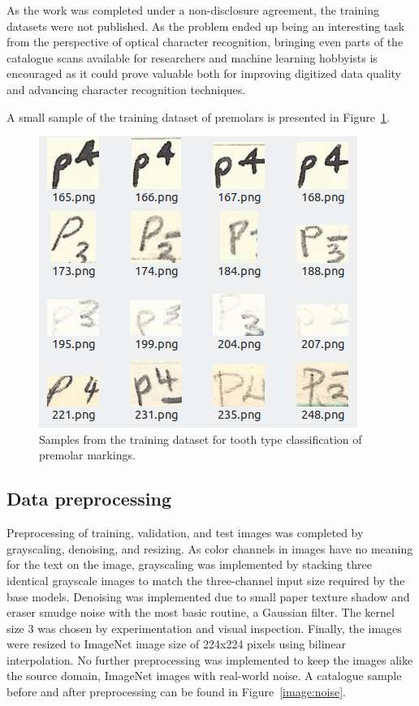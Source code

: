\documentclass[english,twoside,openright]{UH_DS_MSc}
\begin{document}
As the work was completed under a non-disclosure agreement, the training datasets were not 
published. As the problem ended up being an interesting task from the perspective of optical character recognition, 
bringing even parts of the catalogue scans available for researchers and machine learning hobbyists is encouraged as it could prove
 valuable both for improving digitized data quality and advancing character recognition techniques.
 
A small sample of the training dataset of premolars is presented in Figure~\ref{image:samples}.

\begin{figure}[ht]
    \centering
    \includegraphics*[scale=.5]{images/trainingsamples.png}
    \caption{Samples from the training dataset for tooth type classification of premolar markings.}
    \label{image:samples}
\end{figure}

\subsection{Data preprocessing}
 
Preprocessing of training, validation, and test images was completed by grayscaling, denoising, and resizing.
As color channels in images have no meaning for the text on the image, grayscaling was implemented by
 stacking three identical grayscale images
to match the three-channel input size required by the base models.
Denoising was implemented due to
small paper texture shadow and eraser smudge noise with the most basic routine, a Gaussian filter.
The kernel size 3 was chosen by experimentation and visual inspection. Finally, the images were resized to 
ImageNet image size of 224x224 pixels using bilinear interpolation.
No further preprocessing was implemented to keep the images alike the source domain, ImageNet images with real-world noise.
 A catalogue sample before and after preprocessing can 
be found in Figure~\ref{image:noise}.
\end{document}
